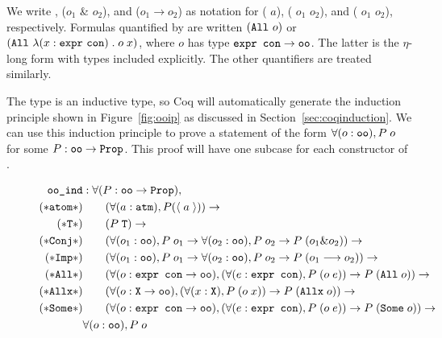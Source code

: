 We write , ($o_1$ \& $o_2$), and ($o_1 \longrightarrow o_2$) as notation for ( $a$), ( $o_1$ $o_2$), and ( $o_1$ $o_2$), respectively. Formulas quantified by  are written $(\texttt{All}~ o)$ or $(\texttt{All}~ \lambda (x:\texttt{expr}~ \texttt{con}) \; . \; o \; x)$, where $o$ has type $\texttt{expr con} \rightarrow \texttt{oo}$. The latter is the $\eta$-long form with types included explicitly. The other quantifiers are treated similarly.

The type  is an inductive type, so Coq will automatically generate the induction principle shown in Figure~\ref{fig:ooip} as discussed in Section~\ref{sec:coqinduction}. We can use this induction principle to prove a statement of the form $\forall (o : \texttt{oo}), P \; o$ for some $P : \texttt{oo} \rightarrow \texttt{Prop}$. This proof will have one subcase for each constructor of .

\begin{figure}
\begin{align*}
\texttt{oo\_ind} &: \forall (P : \texttt{oo} \rightarrow \texttt{Prop}), \\
(*\texttt{atom}*) & \qquad (\forall (a : \texttt{atm}), P (\langle \; a \; \rangle)) \rightarrow \\
(*\texttt{T}*) & \qquad (P \; \texttt{T}) \rightarrow \\
(*\texttt{Conj}*) & \qquad (\forall (o_1 : \texttt{oo}), P \; o_1 \rightarrow \forall (o_2 : \texttt{oo}), P \; o_2 \rightarrow P \; (o_1 \& o_2)) \rightarrow \\
(*\texttt{Imp}*) & \qquad (\forall (o_1 : \texttt{oo}), P \; o_1 \rightarrow \forall (o_2 : \texttt{oo}), P \; o_2 \rightarrow P \; (o_1 \longrightarrow o_2)) \rightarrow \\
(*\texttt{All}*) & \qquad (\forall (o : \texttt{expr con} \rightarrow \texttt{oo}), (\forall (e : \texttt{expr con}), P \; (o \; e)) \rightarrow P \; (\texttt{All} \; o)) \rightarrow \\
(*\texttt{Allx}*) & \qquad (\forall (o : \texttt{X} \rightarrow \texttt{oo}), (\forall (x : \texttt{X}), P \; (o \; x)) \rightarrow P \; (\texttt{Allx} \; o)) \rightarrow \\
(*\texttt{Some}*) & \qquad (\forall (o : \texttt{expr con} \rightarrow \texttt{oo}), (\forall (e : \texttt{expr con}), P \; (o \; e)) \rightarrow P \; (\texttt{Some} \; o)) \rightarrow \\
&\forall (o : \texttt{oo}), P \; o
\end{align*}
\end{figure}

